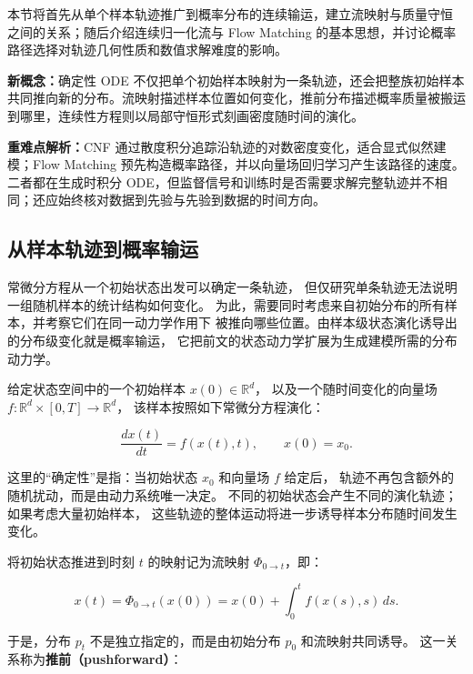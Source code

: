 本节将首先从单个样本轨迹推广到概率分布的连续输运，建立流映射与质量守恒
之间的关系；随后介绍连续归一化流与 Flow Matching 的基本思想，并讨论概率
路径选择对轨迹几何性质和数值求解难度的影响。

\begin{importantnote}
\textbf{新概念：}确定性 ODE 不仅把单个初始样本映射为一条轨迹，还会把整族初始样本共同推向新的分布。流映射描述样本位置如何变化，推前分布描述概率质量被搬运到哪里，连续性方程则以局部守恒形式刻画密度随时间的演化。

\textbf{重难点解析：}CNF 通过散度积分追踪沿轨迹的对数密度变化，适合显式似然建模；Flow Matching 预先构造概率路径，并以向量场回归学习产生该路径的速度。二者都在生成时积分 ODE，但监督信号和训练时是否需要求解完整轨迹并不相同；还应始终核对数据到先验与先验到数据的时间方向。
\end{importantnote}

\subsection{从样本轨迹到概率输运}

常微分方程从一个初始状态出发可以确定一条轨迹，
但仅研究单条轨迹无法说明一组随机样本的统计结构如何变化。
为此，需要同时考虑来自初始分布的所有样本，并考察它们在同一动力学作用下
被推向哪些位置。由样本级状态演化诱导出的分布级变化就是概率输运，
它把前文的状态动力学扩展为生成建模所需的分布动力学。

给定状态空间中的一个初始样本 $x(0)\in\mathbb{R}^d$，
以及一个随时间变化的向量场
$f:\mathbb{R}^d\times[0,T]\rightarrow\mathbb{R}^d$，
该样本按照如下常微分方程演化：

\begin{equation}
\frac{dx(t)}{dt}=f(x(t),t),
\qquad
x(0)=x_0 .
\end{equation}

这里的“确定性”是指：当初始状态 $x_0$ 和向量场 $f$ 给定后，
轨迹不再包含额外的随机扰动，而是由动力系统唯一决定。
不同的初始状态会产生不同的演化轨迹；如果考虑大量初始样本，
这些轨迹的整体运动将进一步诱导样本分布随时间发生变化。

将初始状态推进到时刻 $t$ 的映射记为流映射
$\Phi_{0\rightarrow t}$，即：

\begin{equation}
x(t)
=
\Phi_{0\rightarrow t}(x(0))
=
x(0)+
\int_0^t f(x(s),s)\,ds .
\end{equation}

于是，分布 $p_t$ 不是独立指定的，而是由初始分布 $p_0$ 和流映射共同诱导。
这一关系称为\textbf{推前（pushforward）}：

